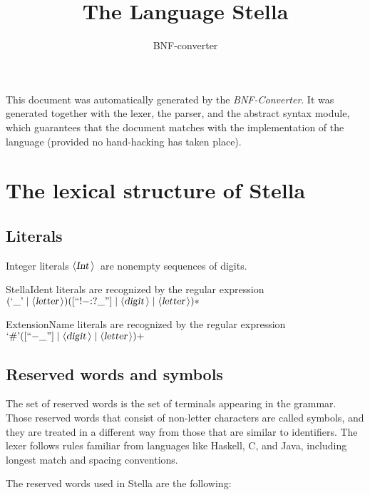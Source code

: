 \documentclass[a4paper,11pt]{article}
\title{The Language Stella}
\author{BNF-converter}
\begin{document}
\maketitle


\newcommand{\emptyP}{\mbox{$\epsilon$}}
\newcommand{\terminal}[1]{\mbox{{\texttt {#1}}}}
\newcommand{\nonterminal}[1]{\mbox{$\langle \mbox{{\sl #1 }} \! \rangle$}}
\newcommand{\arrow}{\mbox{::=}}
\newcommand{\delimit}{\mbox{$|$}}
\newcommand{\reserved}[1]{\mbox{{\texttt {#1}}}}
\newcommand{\literal}[1]{\mbox{{\texttt {#1}}}}
\newcommand{\symb}[1]{\mbox{{\texttt {#1}}}}

This document was automatically generated by the {\em BNF-Converter}.
It was generated together with the lexer, the parser, and the
abstract syntax module, which guarantees that the document
matches with the implementation of the language
(provided no hand-hacking has taken place).

\section*{The lexical structure of Stella}

\subsection*{Literals}
Integer literals \nonterminal{Int}\ are nonempty sequences of digits.



StellaIdent literals are recognized by the regular expression
\((\mbox{`\_'} \mid {\nonterminal{letter}}) ([\mbox{``!{$-$}:?\_''}] \mid {\nonterminal{digit}} \mid {\nonterminal{letter}})*\)

ExtensionName literals are recognized by the regular expression
\(\mbox{`\#'} ([\mbox{``{$-$}\_''}] \mid {\nonterminal{digit}} \mid {\nonterminal{letter}})+\)

\subsection*{Reserved words and symbols}
The set of reserved words is the set of terminals appearing in the grammar. Those reserved words that consist of non-letter characters are called symbols, and they are treated in a different way from those that are similar to identifiers. The lexer follows rules familiar from languages like Haskell, C, and Java, including longest match and spacing conventions.

The reserved words used in Stella are the following: \\
\end{document}
